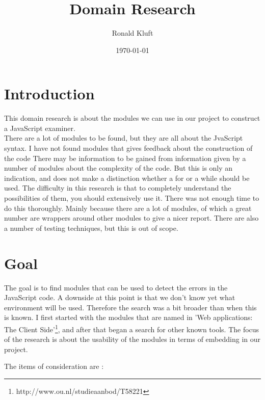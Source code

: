 \documentclass{article}
\begin{document}
\title{Domain Research}
\author{Ronald Kluft}
\date{\today}
\maketitle

\begin{description}
\section{Introduction}

This domain research is about the modules we can use in our project to construct a JavaScript examiner.\\
There are a lot of modules to be found, but they are all about the JvaScript syntax.
I have not found modules that gives feedback about the construction of the code
There may be information to be gained from information given by a number of modules about the complexity of the code. 
But this is only an indication, and does not make a distinction whether a for or a while should be used.
The difficulty in this research is that to completely understand the possibilities of them, you should extensively use it.
There was not enough time to do this thoroughly.
Mainly because there are a lot of modules, of which a great number are wrappers around other modules to give a nicer report.
There are also a number of testing techniques, but this is out of scope.

\section{Goal}
The goal is to find modules that can be used to detect the errors in the JavaScript code.
A downside at this point is that we don't know yet what environment will be used.
Therefore the search was a bit broader than when this is known.
I first started with the modules that are named in 'Web applications: The Client Side'\footnote{http://www.ou.nl/studieaanbod/T58221}, and after that began a search for other known tools.
The focus of the research is about the usability of the modules in terms of embedding in our project.

The items of consideration are :\\
\item[The name of the module]
\item[The location]
\item[What is does]
\item[omgeving?]
\item[Configurability]
\item[Output]


\end{description}
\end{document}
